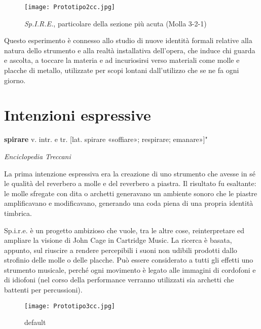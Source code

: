 
\begin{figure}[htbp]
\begin{center}
\texttt{[image: Prototipo2cc.jpg]}
\caption{\textit{Sp.I.R.E.}, particolare della sezione più acuta (Molla 3-2-1)}
\label{default}
\end{center}
\end{figure}

Questo esperimento è connesso allo studio di nuove identità formali relative alla natura dello strumento e alla realtà installativa dell'opera, che induce chi guarda e ascolta, a toccare la materia e ad incuriosirsi verso materiali come molle e placche di metallo, utilizzate per scopi lontani dall'utilizzo che se ne fa ogni giorno.

\section{Intenzioni espressive}

\epigraph{\textbf{spirare} v. intr. e tr. [lat. spirare «soffiare»; respirare; emanare»]"}
{\textit{Enciclopedia Treccani}}
La prima intenzione espressiva era la creazione di uno strumento che avesse in sé le qualità del reverbero a molle e del reverbero a piastra. Il risultato fu esaltante: le molle sfregate con dita o archetti generavano un ambiente sonoro che le piastre amplificavano e modificavano, generando una coda piena di una propria identità timbrica.

Sp.i.r.e. è un progetto ambizioso che vuole, tra le altre cose, reinterpretare ed ampliare la visione di John Cage in Cartridge Music. La ricerca è basata, appunto, sul riuscire a rendere percepibili i suoni non udibili prodotti dallo strofinio delle molle o delle placche. Può essere considerato a tutti gli effetti uno strumento musicale, perché ogni movimento è legato alle immagini di cordofoni e di idiofoni (nel corso della performance verranno utilizzati sia archetti che battenti per percussioni).

\begin{figure}[htbp]
\begin{center}
\texttt{[image: Prototipo3cc.jpg]}
\caption{default}
\label{default}
\end{center}
\end{figure}


